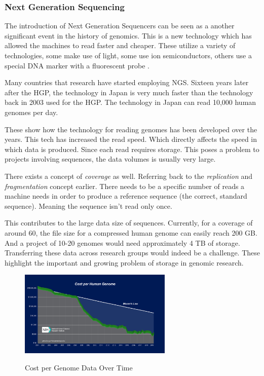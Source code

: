 \documentclass{article}
\begin{document}
\subsubsection{Next Generation Sequencing}


The introduction of Next Generation Sequencers can be seen as a another significant event in the history of genomics. This is a new technology which has allowed the machines to read faster and cheaper. These utilize a variety of technologies, some make use of light, some use ion semiconductors, others use a special DNA marker with a fluorescent probe \autocite[~p.67]{paulselzer2018}.  


Many countries that research have started employing NGS. Sixteen years later after the HGP, the technology in Japan is very much faster than the technology back in 2003 used for the HGP. The technology in Japan can read 10,000 human genomes per day. \autocite[p.~19]{introgenomics} 

These show how the technology for reading genomes has been developed over the years. This tech has increased the read speed. Which directly affects the speed in which data is produced. Since each read requires storage. This poses a problem to projects involving sequences, the data volumes is usually very large\autocite{bon_compression}. 

There exists a concept of \textit{coverage} as well. Referring back to the \textit{replication} and \textit{fragmentation} concept earlier. There needs to be a specific number of reads a machine needs in order to produce a reference sequence (the correct, standard sequence). Meaning the sequence isn't read only once. 

This contributes to the large data size of sequences. Currently, for a coverage of around 60, the file size for a compressed human genome can easily reach 200 GB. And a project of 10-20 genomes would need approximately 4 TB of storage. Transferring these data across research groups would indeed be a challenge. \autocite[~p.68]{paulselzer2018} These highlight the important and growing problem of storage in genomic research.



\begin{figure}[h]
\caption{Cost per Genome Data Over Time}
\centering
\includegraphics[width=0.65\textwidth]{images/human-gen-cost.jpg} 
\label{fig:human_gen_cost_fig}
\end{figure}
\end{document}
